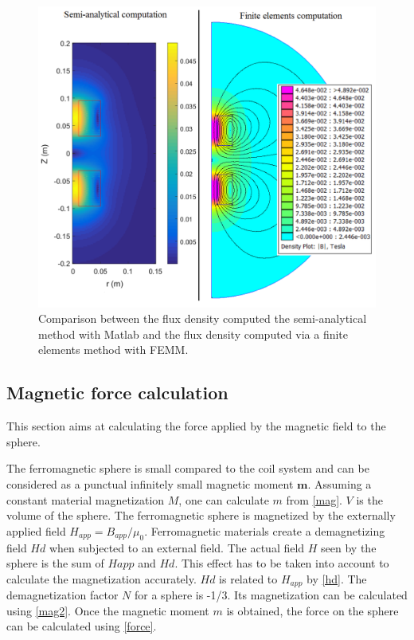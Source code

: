\documentclass[letterpaper, 10 pt, conference]{ieeeconf}  %
\begin{document}
\begin{figure}
  \includegraphics[width=\linewidth]{Femm_matlab_comparison.png}
  \caption{Comparison between the flux density computed the semi-analytical method with Matlab and the flux density computed via a finite elements method with FEMM.}
  \label{Femm_matlab_comparison}
\end{figure}

\subsection{Magnetic force calculation}

This section aims at calculating the force applied by the magnetic field to the sphere.\par
The ferromagnetic sphere is small compared to the coil system and can be considered as a punctual infinitely small magnetic moment $\mathbf{m}$. Assuming a constant material magnetization $M$, one can calculate $m$ from \ref{mag}. $V$ is the volume of the sphere.
The ferromagnetic sphere is magnetized by the externally applied field $H_{app}=B_{app}/\mu_0$. Ferromagnetic materials create a demagnetizing field $Hd$ when subjected to an external field. The actual field $H$ seen by the sphere is the sum of $Happ$ and $Hd$. This effect has to be taken into account to calculate the magnetization accurately. $Hd$ is related to $H_{app}$ by \ref{hd}. The demagnetization factor $N$ for a sphere is -1/3. Its magnetization can be calculated using \ref{mag2}.
Once the magnetic moment $m$ is obtained, the force on the sphere can be calculated using \ref{force}.
\end{document}

